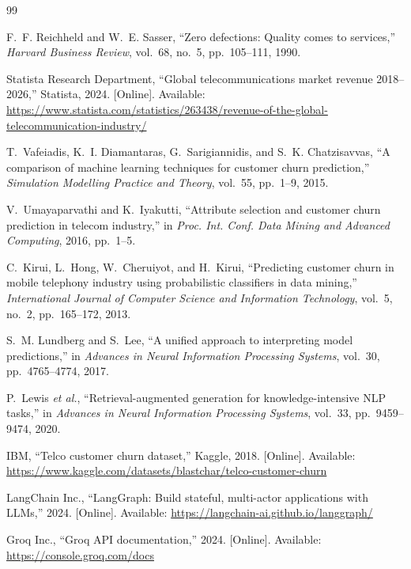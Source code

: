 \documentclass[conference]{IEEEtran}
\begin{document}
\begin{thebibliography}{99}

F.~F. Reichheld and W.~E. Sasser,
``Zero defections: Quality comes to services,''
\textit{Harvard Business Review}, vol.~68, no.~5, pp.~105--111, 1990.

Statista Research Department,
``Global telecommunications market revenue 2018--2026,''
Statista, 2024. [Online].
Available: \url{https://www.statista.com/statistics/263438/revenue-of-the-global-telecommunication-industry/}

T.~Vafeiadis, K.~I. Diamantaras, G.~Sarigiannidis, and S.~K. Chatzisavvas,
``A comparison of machine learning techniques for customer churn prediction,''
\textit{Simulation Modelling Practice and Theory}, vol.~55, pp.~1--9, 2015.

V.~Umayaparvathi and K.~Iyakutti,
``Attribute selection and customer churn prediction in telecom industry,''
in \textit{Proc. Int. Conf. Data Mining and Advanced Computing}, 2016,
pp.~1--5.

C.~Kirui, L.~Hong, W.~Cheruiyot, and H.~Kirui,
``Predicting customer churn in mobile telephony industry using probabilistic
classifiers in data mining,''
\textit{International Journal of Computer Science and Information Technology},
vol.~5, no.~2, pp.~165--172, 2013.

S.~M. Lundberg and S.~Lee,
``A unified approach to interpreting model predictions,''
in \textit{Advances in Neural Information Processing Systems}, vol.~30,
pp.~4765--4774, 2017.

P.~Lewis \textit{et al.},
``Retrieval-augmented generation for knowledge-intensive NLP tasks,''
in \textit{Advances in Neural Information Processing Systems}, vol.~33,
pp.~9459--9474, 2020.

IBM,
``Telco customer churn dataset,''
Kaggle, 2018. [Online].
Available: \url{https://www.kaggle.com/datasets/blastchar/telco-customer-churn}

LangChain Inc.,
``LangGraph: Build stateful, multi-actor applications with LLMs,''
2024. [Online].
Available: \url{https://langchain-ai.github.io/langgraph/}

Groq Inc.,
``Groq API documentation,''
2024. [Online].
Available: \url{https://console.groq.com/docs}


\end{thebibliography}
\end{document}
